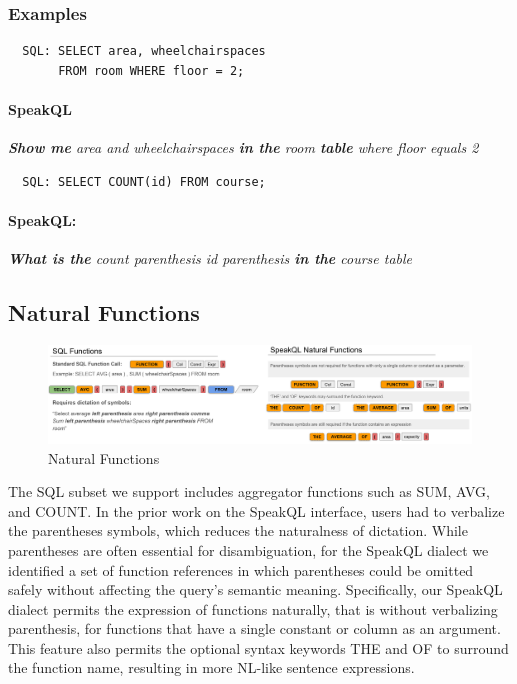 \subsubsection{\textbf{Examples}}

\begin{verbatim}
  SQL: SELECT area, wheelchairspaces 
       FROM room WHERE floor = 2;
\end{verbatim}
\paragraph{SpeakQL} \emph{\textbf{Show me} area and wheelchairspaces \textbf{in the} room \textbf{table} where floor equals 2}

\vspace{2mm}
\begin{verbatim}
  SQL: SELECT COUNT(id) FROM course;
\end{verbatim}
\paragraph{SpeakQL:} \emph{\textbf{What is the} count parenthesis id parenthesis \textbf{in the} course table}



\subsection{Natural Functions}

\begin{figure}[ht]
    \centering
    \includegraphics[width=\textwidth]{figures/natural_functions.png}
    \caption{Natural Functions}
    \label{fig:naturalfunctions}
\end{figure}

The SQL subset we support includes aggregator functions such as SUM, AVG, and COUNT. 
In the prior work on the SpeakQL interface, users had to verbalize the parentheses symbols, which reduces the naturalness of dictation. 
While parentheses are often essential for disambiguation, for the SpeakQL dialect we identified a set of function references in which parentheses could be omitted safely without affecting the query's semantic meaning. 
Specifically, our SpeakQL dialect permits the expression of functions naturally, that is without verbalizing parenthesis, for functions that have a single constant or column as an argument. 
This feature also permits the optional syntax keywords THE and OF to surround the function name, resulting in more NL-like sentence expressions. 

